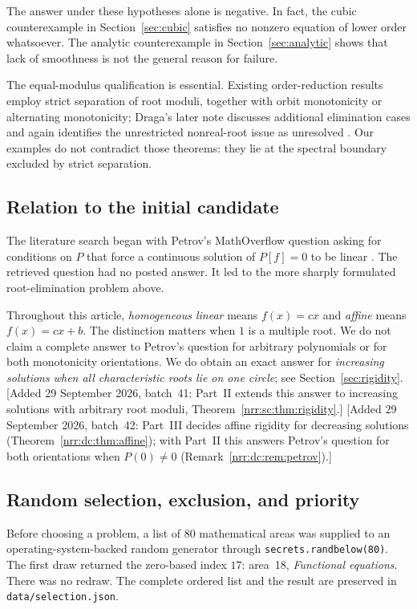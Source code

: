 \documentclass[11pt,letterpaper]{article}
\theoremstyle{definition}
\theoremstyle{remark}
\begin{document}
The answer under these hypotheses alone is negative. In fact, the cubic
counterexample in Section~\ref{sec:cubic} satisfies no nonzero equation of
lower order whatsoever. The analytic counterexample in
Section~\ref{sec:analytic} shows that lack of smoothness is not the general
reason for failure.

The equal-modulus qualification is essential. Existing order-reduction
results employ strict separation of root moduli, together with orbit
monotonicity or alternating monotonicity; Draga's later note discusses
additional elimination cases and again identifies the unrestricted
nonreal-root issue as unresolved \cite{D2016}. Our examples do not
contradict those theorems: they lie at the spectral boundary excluded by
strict separation.

\subsection{Relation to the initial candidate}

The literature search began with Petrov's MathOverflow question asking for
conditions on $P$ that force a continuous solution of $P[f]=0$ to be linear
\cite{Petrov2016}. The retrieved question had no posted answer. It led to
the more sharply formulated root-elimination problem above.

Throughout this article, \emph{homogeneous linear} means $f(x)=cx$ and
\emph{affine} means $f(x)=cx+b$. The distinction matters when $1$ is a
multiple root. We do not claim a complete answer to Petrov's question for
arbitrary polynomials or for both monotonicity orientations. We do obtain
an exact answer for \emph{increasing solutions when all characteristic
roots lie on one circle}; see Section~\ref{sec:rigidity}.
[Added 29 September 2026, batch~41: Part~II extends this answer to increasing
solutions with arbitrary root moduli, Theorem~\ref{nrr:sc:thm:rigidity}.]
[Added 29 September 2026, batch~42: Part~III decides affine rigidity for
decreasing solutions (Theorem~\ref{nrr:dc:thm:affine}); with Part~II this
answers Petrov's question for both orientations when $P(0)\ne0$
(Remark~\ref{nrr:dc:rem:petrov}).]

\subsection{Random selection, exclusion, and priority}

Before choosing a problem, a list of 80 mathematical areas was supplied to
an operating-system-backed random generator through
\texttt{secrets.randbelow(80)}. The first draw returned the zero-based index
$17$: area~18, \emph{Functional equations}. There was no redraw. The complete
ordered list and the result are preserved in
\texttt{data/selection.json}.
\end{document}
